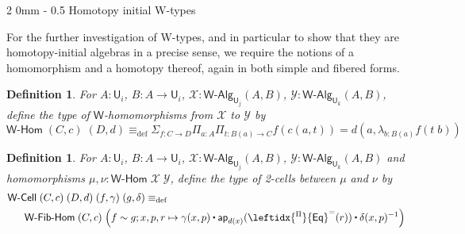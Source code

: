 \documentclass[reqno,10pt,a4paper,oneside]{amsart}
\makeatletter
\numberwithin{equation}{section}
\renewcommand{\subsection}{\@startsection
  {subsection}%
  {2}%
  {0mm}%
  {-\baselineskip}%
  {0.5\baselineskip}%
  {\normalfont\normalsize\bf}}%
\theoremstyle{mythm}
\theoremstyle{mydef}
\newtheorem{definition}[theorem]{Definition}
\theoremstyle{myrmk}
\newcommand{\deq}{\equiv}
\newcommand{\defeq}{\deq_{\mathrm{def}}}
\newcommand{\ct}{%
  \mathchoice{\mathbin{\raisebox{0.5ex}{$\displaystyle\centerdot$}}}%
             {\mathbin{\raisebox{0.5ex}{$\centerdot$}}}%
             {\mathbin{\raisebox{0.25ex}{$\scriptstyle\,\centerdot\,$}}}%
             {\mathbin{\raisebox{0.1ex}{$\scriptscriptstyle\,\centerdot\,$}}}}
\newcommand{\funext}{\leftidx{^\Pi}{\mathsf{Eq}}^{=}}
\newcommand{\prd}[1]{\Pi_{#1}}
\newcommand{\sm}[1]{\Sigma_{#1}}
\newcommand{\lam}[1]{\lambda_{#1}}
\newcommand{\app}{\mathsf{ap}}
\newcommand{\W}{\mathsf{W}}
\newcommand{\wsup}{\mathsf{sup}}
\newcommand{\UU}{\mathsf{U}}
\newcommand{\WCell}{\mathsf{W}\text{-}\mathsf{Cell}}
\newcommand{\WAlg}{\mathsf{W}\text{-}\mathsf{Alg}}
\newcommand{\WHom}{\mathsf{W}\text{-}\mathsf{Hom}}
\newcommand{\WFibHom}{\mathsf{W}\text{-}\mathsf{Fib}\text{-}\mathsf{Hom}}
\newcommand{\X}{\mathcal{X}}
\newcommand{\Y}{\mathcal{Y}}
\makeatother
\begin{document}
%



\subsection{Homotopy initial W-types}

For the further investigation of W-types, and in particular to show that they are homotopy-initial algebras in a precise sense, we require the notions of a homomorphism and a homotopy thereof, again in both simple and fibered forms.


\begin{definition}\label{def:WHom}
For $A:\UU_i$, $B : A \to \UU_i$, $\X : \WAlg_{\UU_j}(A,B)$, $\Y : \WAlg_{\UU_k}(A,B)$, define the type of \emph{$\W$-homomorphisms} from $\X$ to $\Y$ by
\[ \WHom \; (C,c) \; (D,d) \defeq \sm{f:C\to D}\prd{a:A}\prd{t: B(a) \to C} f(c(a,t)) = d(a,\lam{b:B(a)} f(t\;b)) \]
\end{definition}


\begin{definition}\label{def:WCell}
For $A:\UU_i$, $B : A \to \UU_i$, $\X : \WAlg_{\UU_j}(A,B)$, $\Y : \WAlg_{\UU_k}(A,B)$ and homomorphisms $\mu, \nu : \WHom \; \X \; \Y$, define the type of \emph{2-cells} between $\mu$ and $\nu$ by
\begin{align*} & \WCell \; (C,c) \; (D,d) \; (f,\gamma) \; (g,\delta) \defeq \\ & \;\;\; \;\;\;\WFibHom \; (C,c) \; \Big(f \sim g; x,p,r \mapsto \gamma(x,p) \ct \app_{d(x)}(\funext(r)) \ct \delta(x,p)^{-1}\Big)
\end{align*}
\end{definition}
\end{document}
